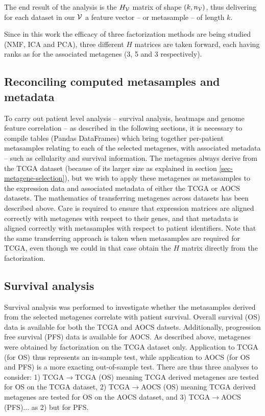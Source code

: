 \documentclass[tikz, 12pt,a4paper,oneside,fleqn]{article}
\begin{document}
The end result of the analysis is the $H_{\mathcal{V}}$ matrix of shape $(k, n_{\mathcal{V}})$, thus delivering for each dataset in our $\mathcal{V}$ a feature vector -- or metasample -- of length $k$. 

Since in this work the efficacy of three factorization methods are being studied (NMF, ICA and PCA), three different $H$ matrices are taken forward, each having ranks as for the associated metagenes (3, 5 and 3 respectively).

\subsection{Reconciling computed metasamples and metadata}
\label{sec-reconciling-metasamples-metadata}

To carry out patient level analysis -- survival analysis, heatmaps and genome feature correlation -- as described in the following sections, it is necessary to compile tables (Pandas DataFrames) which bring together per-patient metasamples relating to each of the selected metagenes, with associated metadata -- such as cellularity and survival information.   The metagenes always derive from the TCGA dataset (because of its larger size as explained in section \ref{sec-metagene-selection}), but we wish to apply these metagenes as metasamples to the expression data and associated metadata of either the TCGA or AOCS datasets.   
The mathematics of transferring metagenes across datasets has been described above.  Care is required to ensure that expression matrices are aligned correctly with metagenes with respect to their genes, and that metadata is aligned correctly with metasamples with respect to patient identifiers.
Note that the same transferring approach is taken when metasamples are required for TCGA, even though we could in that case obtain the $H$ matrix directly from the factorization.


\subsection{Survival analysis}
\label{sec-survival-analysis}

Survival analysis was performed to investigate whether the metasamples derived from the selected metagenes correlate with patient survival.  Overall  survival (OS) data is available for both the TCGA and AOCS datsets.  Additionally, progression free survival (PFS) data is available for AOCS.   As described above,  metagenes were obtained by factorization on the TCGA dataset only.  Application to TCGA (for OS) thus represents an in-sample test, while application to AOCS (for OS and PFS) is a more exacting out-of-sample test. There are thus three analyses to consider: 
1) TCGA$\rightarrow$TCGA (OS) meaning TCGA derived metagenes are tested for OS on the TCGA dataset, 2) TCGA$\rightarrow$AOCS (OS) meaning TCGA derived metagenes are tested for OS on the AOCS dataset, and 3) TCGA$\rightarrow$AOCS (PFS)... as 2) but for PFS. 
\end{document}
